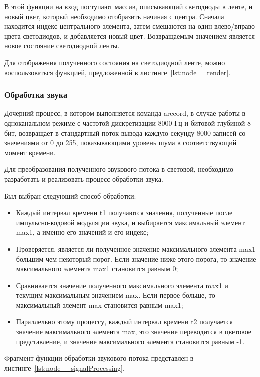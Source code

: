 В этой функции на вход поступают массив, описывающий светодиоды в ленте, и новый цвет, который необходимо отобразить начиная с центра. Сначала находится индекс центрального элемента, затем смещаются на один влево/вправо цвета светодиодов, и добавляется новый цвет. Возвращаемым значением является новое состояние светодиодной ленты.

Для отображения полученного состояния на светодиодной ленте, можно воспользоваться функцией, предложенной в листинге~\ref{lst:node__render}.



\subsubsection{Обработка звука}

Дочерний процесс, в котором выполняется команда arecord, в случае работы в одноканальном режиме с частотой дискретизации 8000 Гц и битовой глубиной 8 бит, возвращает в стандартный поток вывода каждую секунду 8000 записей со значениями от 0 до 255, показывающими уровень шума в соответствующий момент времени.

Для преобразования полученного звукового потока в световой, необходимо разработать и реализовать процесс обработки звука.

Был выбран следующий способ обработки:

\begin{itemize}
  \item Каждый интервал времени t1 получаются значения, полученные после импульсно-кодовой модуляции звука, и выбирается максимальный элемент max1, а именно его значений и его индекс;
  \item Проверяется, является ли полученное значение максимального элемента max1 большим чем некоторый порог. Если значение ниже этого порога, то значение максимального элемента max1 становится равным 0;
  \item Сравнивается значение полученного максимального элемента max1 и текущим максимальным значением max. Если первое больше, то максимальный элемент max становится равным max1;
  \item Параллельно этому процессу, каждый интервал времени t2 получается значение максимального элемента max, это значение переводится в цветовое представление, и значение максимального элемента становится равным -1.
\end{itemize}

Фрагмент функции обработки звукового потока представлен в листинге~\ref{lst:node__signalProcessing}.




